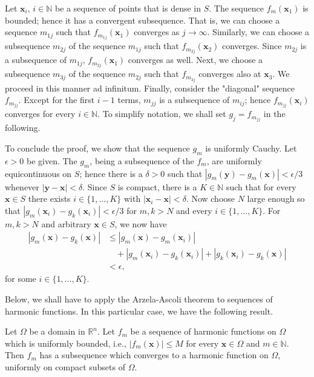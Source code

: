 \begin{Proof}
Let $\bm{x}_i$, $i\in\mathbb{N}$ be a sequence of points that is dense in $S$. The sequence $f_m(\bm{x}_1)$ is bounded; hence it has a convergent subsequence. That is, we can choose a sequence $m_{1j}$ such that $f_{m_{1j}}(\bm{x}_1)$ converges as $j\to\infty$. Similarly, we can choose a subsequence $m_{2j}$ of the sequence $m_{1j}$ such that $f_{m_{2j}}(\bm{x}_2)$ converges. Since $m_{2j}$ is a subsequence of $m_{1j}$, $f_{m_{2j}}(\bm{x}_1)$ converges as well. Next, we choose a subsequence $m_{3j}$ of the sequence $m_{2j}$ such that $f_{m_{3j}}$ converges also at $\bm{x}_3$. We proceed in this manner ad infinitum. Finally, consider the "diagonal" sequence $f_{m_{jj}}$. Except for the first $i-1$ terms, $m_{jj}$ is a subsequence of $m_{ij}$; hence $f_{m_{jj}}(\bm{x}_i)$ converges for every $i\in\mathbb{N}$. To simplify notation, we shall set $g_j=f_{m_{jj}}$ in the following.

To conclude the proof, we show that the sequence $g_m$ is uniformly Cauchy. Let $\epsilon>0$ be given. The $g_m$, being a subsequence of the $f_m$, are uniformly equicontinuous on $S$; hence there is a $\delta>0$ such that $|g_m(\bm{y})-g_m(\bm{x})|<\epsilon/3$ whenever $|\bm{y}-\bm{x}|<\delta$. Since $S$ is compact, there is a $K\in\mathbb{N}$ such that for every $\bm{x}\in S$ there exists $i\in\{1,\ldots,K\}$ with $|\bm{x}_i-\bm{x}|<\delta$. Now choose $N$ large enough so that $|g_m(\bm{x}_i)-g_k(\bm{x}_i)|<\epsilon/3$ for $m,k>N$ and every $i\in\{1,\ldots,K\}$. For $m,k>N$ and arbitrary $\bm{x}\in S$, we now have
\begin{equation}\label{eq:arzela-ascoli-uniform-cauchy-estimate}
\begin{aligned}
|g_m(\bm{x})-g_k(\bm{x})|
&\leq|g_m(\bm{x})-g_m(\bm{x}_i)|\\
&\quad+|g_m(\bm{x}_i)-g_k(\bm{x}_i)|+|g_k(\bm{x}_i)-g_k(\bm{x})|\\
&<\epsilon,
\end{aligned}
\end{equation}
for some $i\in\{1,\ldots,K\}$.
\end{Proof}

Below, we shall have to apply the Arzela-Ascoli theorem to sequences of harmonic functions. In this particular case, we have the following result.

\begin{Theorem}
\label{thm:harmonic-sequence-compactness}
Let $\Omega$ be a domain in $\mathbb{R}^n$. Let $f_m$ be a sequence of harmonic functions on $\Omega$ which is uniformly bounded, i.e., $|f_m(\bm{x})|\leq M$ for every $\bm{x}\in\Omega$ and $m\in\mathbb{N}$. Then $f_m$ has a subsequence which converges to a harmonic function on $\Omega$, uniformly on compact subsets of $\Omega$.
\end{Theorem}

